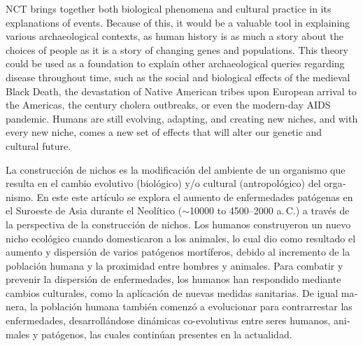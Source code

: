 NCT brings together both biological phenomena and cultural practice in its explanations of events. Because of this, it would be a valuable tool in explaining various archaeological contexts, as human history is as much a story about the choices of people as it is a story of changing genes and populations. 
This theory could be used as a foundation to explain other archaeological queries regarding disease throughout time, such as the social and biological effects of the medieval Black Death, the devastation of Native American tribes upon European arrival to the Americas, the  century cholera outbreaks, or even the modern-day AIDS pandemic. Humans are still evolving, adapting, and creating new niches, and with every new niche, comes a new set of effects that will alter our genetic and cultural future.	
\myseparator
	\begin{myabstract}
\foreignlanguage{spanish}{
	La construcción de nichos es la modificación del ambiente de un organismo que resulta en el cambio evolutivo (biológico) y/o cultural (antropológico) del organismo. En este este artículo se explora el aumento de enfermedades patógenas en el Suroeste de Asia durante el Neolítico ($\sim$10000 to 4500--2000 a.\,C.) a través de la perspectiva de la construcción de nichos. Los humanos construyeron un nuevo nicho ecológico cuando domesticaron a los animales, lo cual dio como resultado el aumento y dispersión de varios patógenos mortíferos, debido al incremento de la población humana y la proximidad entre hombres y animales. Para combatir y prevenir la dispersión de enfermedades, los humanos han respondido mediante cambios culturales, como la aplicación de nuevas medidas sanitarias. De igual manera, la población humana también comenzó a evolucionar para contrarrestar las enfermedades, desarrollándose dinámicas co-evolutivas entre seres humanos, animales y patógenos, las cuales continúan presentes en la actualidad.}

		
	\end{myabstract}
	

\printbibliography[heading=subbibnumbered] 
\label{Scollan:lastpage}
\closingarticle
